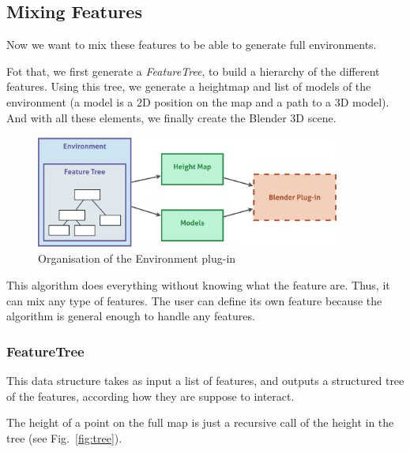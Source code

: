 

\subsection{Mixing Features}
Now we want to mix these features to be able to generate full environments.

Fot that, we first generate a \textit{FeatureTree}, to build a hierarchy of the different features. Using this tree, we generate a heightmap and list of models of the environment (a model is a 2D position on the map and a path to a 3D model). And with all these elements, we finally create the Blender 3D scene.

\begin{figure}[h]
  \begin{center}
    \includegraphics[width=10cm]{img/env_global.pdf}
    \caption{Organisation of the Environment plug-in}
    \label{fig:env_global}
  \end{center}
\end{figure}

This algorithm does everything without knowing what the feature are. Thus, it can mix any type of features. The user can define its own feature because the algorithm is general enough to handle any features.


\subsubsection{FeatureTree}
This data structure takes as input a list of features, and outputs a structured tree of the features, according how they are suppose to interact. 

The height of a point on the full map is just a recursive call of the height in the tree (see Fig.~\ref{fig:tree}).

